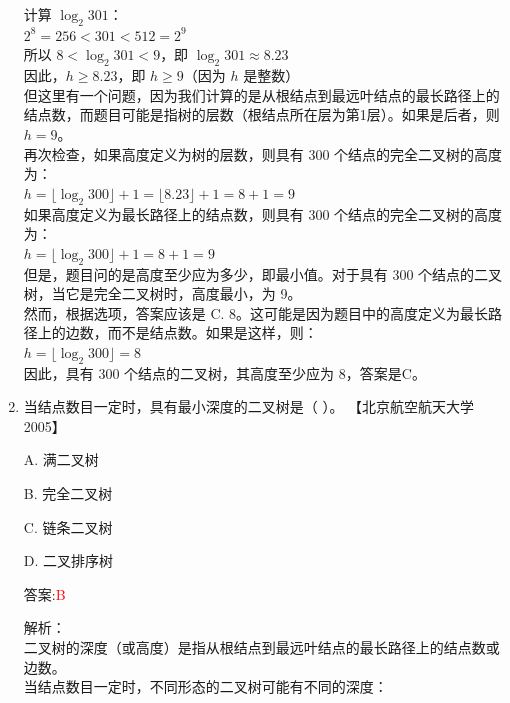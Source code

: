 \documentclass[lang=cn,newtx,10pt,scheme=chinese]{../../../elegantbook}
\begin{document}
\begin{enumerate}
    计算 $\log_2 301$：\\
    $2^8 = 256 < 301 < 512 = 2^9$\\
    所以 $8 < \log_2 301 < 9$，即 $\log_2 301 \approx 8.23$\\
    
    因此，$h \geq 8.23$，即 $h \geq 9$（因为 $h$ 是整数）\\
    
    但这里有一个问题，因为我们计算的是从根结点到最远叶结点的最长路径上的结点数，而题目可能是指树的层数（根结点所在层为第1层）。如果是后者，则 $h = 9$。\\
    
    再次检查，如果高度定义为树的层数，则具有 300 个结点的完全二叉树的高度为：\\
    $h = \lfloor \log_2 300 \rfloor + 1 = \lfloor 8.23 \rfloor + 1 = 8 + 1 = 9$\\
    
    如果高度定义为最长路径上的结点数，则具有 300 个结点的完全二叉树的高度为：\\
    $h = \lfloor \log_2 300 \rfloor + 1 = 8 + 1 = 9$\\
    
    但是，题目问的是高度至少应为多少，即最小值。对于具有 300 个结点的二叉树，当它是完全二叉树时，高度最小，为 9。\\
    
    然而，根据选项，答案应该是 C. 8。这可能是因为题目中的高度定义为最长路径上的边数，而不是结点数。如果是这样，则：\\
    $h = \lfloor \log_2 300 \rfloor = 8$\\
    
    因此，具有 300 个结点的二叉树，其高度至少应为 8，答案是C。\\  

    \item 当结点数目一定时，具有最小深度的二叉树是（ ）。  
    【北京航空航天大学 2005】  

    A. 满二叉树  

    B. 完全二叉树  

    C. 链条二叉树  

    D. 二叉排序树  
    
    答案:\textcolor{red}{B}
    
    解析：\\
    二叉树的深度（或高度）是指从根结点到最远叶结点的最长路径上的结点数或边数。\\
    
    当结点数目一定时，不同形态的二叉树可能有不同的深度：\\
    

\end{enumerate}
\end{document}
